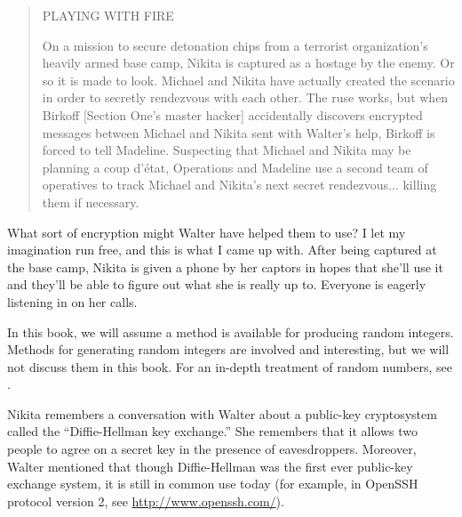 \begin{quote}
PLAYING WITH FIRE

On a mission to secure detonation chips from a terrorist
organization's heavily armed base camp, Nikita is captured as a
hostage by the enemy.  Or so it is made to look.  Michael and Nikita
have actually created the scenario in order to secretly rendezvous
with each other. The ruse works, but when Birkoff [Section One's
master hacker] accidentally discovers encrypted messages between
Michael and Nikita sent with Walter's help, Birkoff is forced to tell
Madeline.  Suspecting that Michael and Nikita may be planning a coup
d'\'etat, Operations and Madeline use a second team of operatives to
track Michael and Nikita's next secret rendezvous... killing them if
necessary.
\end{quote}


What sort of encryption might Walter have helped them to use? I let my
imagination run free, and this is what I came up with.  After being
captured at the base camp, Nikita is given a phone by her captors in
hopes that she'll use it and they'll be able to figure out what she is
really up to.  Everyone is eagerly listening in on her calls.

\begin{remark}
  In this book, we will assume a method is available for producing
  random integers.  Methods for generating random integers are
  involved and interesting, but we will not discuss them in this book.
  For an in-depth treatment of random numbers, see
  \cite[Ch.~3]{knuth2}.
\end{remark}

Nikita remembers a conversation with Walter about a public-key
cryptosystem called the ``Diffie-Hellman key exchange.''  She
remembers that it allows two people to agree on a secret key in the
presence of eavesdroppers.  Moreover, Walter mentioned that though
Diffie-Hellman
was the first ever public-key exchange system, it is still in
common use today (for example, in OpenSSH protocol version 2,
see \url{http://www.openssh.com/}).

